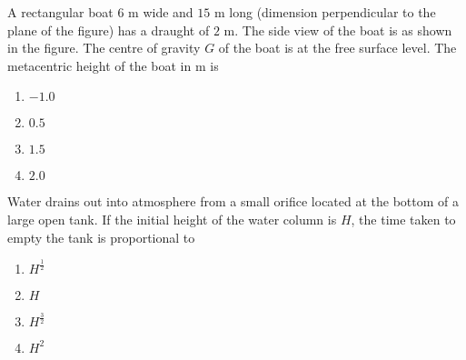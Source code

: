     \item A rectangular boat $6$ m wide and $15$ m long (dimension perpendicular to the plane of the figure) has a draught of $2$ m. The side view of the boat is as shown in the figure. The centre of gravity $G$ of the boat is at the free surface level. The metacentric height of the boat in m is 
    \begin{figure}[H]
    \centering

    \label{fig:my_label}
    \end{figure}
    \begin{multicols}{4}
        \begin{enumerate}
            \item $-1.0$
            \item $0.5$
            \item $1.5$
            \item $2.0$
        \end{enumerate}
    \end{multicols}

    \item Water drains out into atmosphere from a small orifice located at the bottom of a large open tank. If the initial height of the water column is $H$, the time taken to empty the tank is proportional to
    \begin{multicols}{4}
        \begin{enumerate}
            \item $H^{\frac{1}{2}}$
            \item $H$
            \item $H^{\frac{3}{2}}$
            \item $H^{2}$
        \end{enumerate}
    \end{multicols}

